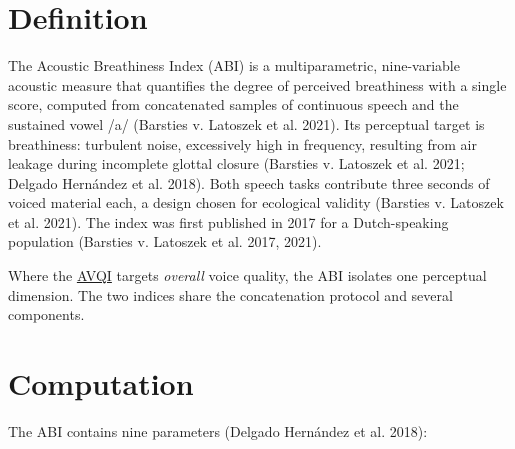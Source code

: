\documentclass[
  english,
  letterpaper,
]{scrbook}
\begin{document}
\section{Definition}\label{definition-2}

The Acoustic Breathiness Index (ABI) is a multiparametric, nine-variable
acoustic measure that quantifies the degree of perceived breathiness
with a single score, computed from concatenated samples of continuous
speech and the sustained vowel /a/ (Barsties v. Latoszek et al. 2021).
Its perceptual target is breathiness: turbulent noise, excessively high
in frequency, resulting from air leakage during incomplete glottal
closure (Barsties v. Latoszek et al. 2021; Delgado Hernández et al.
2018). Both speech tasks contribute three seconds of voiced material
each, a design chosen for ecological validity (Barsties v. Latoszek et
al. 2021). The index was first published in 2017 for a Dutch-speaking
population (Barsties v. Latoszek et al. 2017, 2021).

Where the \hyperref[acoustic-voice-quality-index-avqi]{AVQI} targets
\emph{overall} voice quality, the ABI isolates one perceptual dimension.
The two indices share the concatenation protocol and several components.

\section{Computation}\label{computation-2}

The ABI contains nine parameters (Delgado Hernández et al. 2018):
\end{document}
